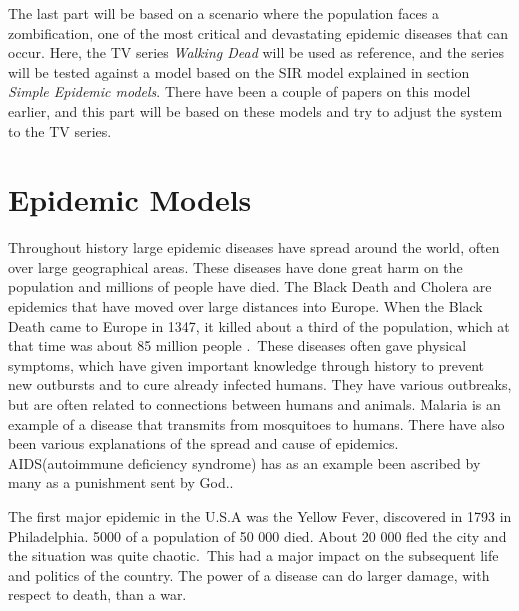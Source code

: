 \documentclass[%
twoside,                 %
final,                   %
10pt]{article}
\begin{document}
\vspace{3mm}


The last part will be based on a scenario where the population faces a zombification, one of the most critical and devastating epidemic diseases that can occur. Here, the TV series \emph{Walking Dead} will be used as reference, and the series will be tested against a model based on the SIR model explained in section \emph{Simple Epidemic models}. There have been a couple of papers on this model earlier, and this part will be based on these models and try to adjust the system to the TV series.     
\section{Epidemic Models}
Throughout history large epidemic diseases have spread around the world, often over large geographical areas. These diseases have done great harm on the population and millions of people have died. The Black Death and Cholera are epidemics that have moved over large distances into Europe. When the Black Death came to Europe in 1347, it killed about a third of the population, which at that time was about 85 million people \cite[p.~315]{murray2002mathematical}.~These diseases often gave physical symptoms, which have given important knowledge through history to prevent new outbursts and to cure already infected humans. They have various outbreaks, but are often related to connections between humans and animals. Malaria is an example of a disease that transmits from mosquitoes to humans. There have also been various explanations of the spread and cause of epidemics. AIDS(autoimmune deficiency syndrome) has as an example been ascribed by many as a punishment sent by God.\cite[p.~316]{murray2002mathematical}.~


\vspace{3mm}




\vspace{3mm}


The first major epidemic in the U.S.A was the Yellow Fever, discovered in 1793 in Philadelphia. 5000 of a population of 50 000 died. About 20 000 fled the city and the situation was quite chaotic\cite[p.~316]{murray2002mathematical}.~This had a major impact on the subsequent life and politics of the country. The power of a disease can do larger damage, with respect to death, than a war.


\vspace{3mm}
\end{document}

